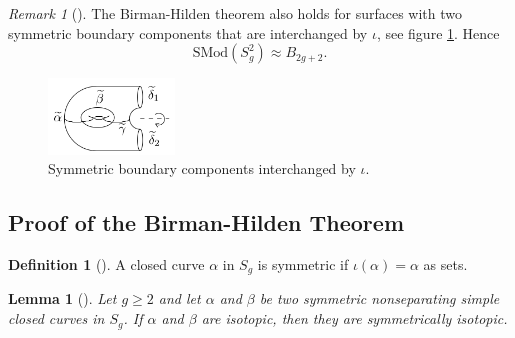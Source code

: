 \documentclass[reqno]{amsart}
\newtheorem{lemma}[theorem]{Lemma}
\theoremstyle{definition}
\newtheorem{definition}[theorem]{Definition}
\theoremstyle{remark}
\newtheorem*{remark}{Remark}
\newcommand{\SMod}{{\mathrm{SMod}}}
\begin{document}
   \begin{remark}[]
       The Birman-Hilden theorem also holds for
       surfaces with two symmetric boundary
       components that are interchanged by
       $\iota$, see figure
       \ref{fig:-Birman-Hilden-two-symmetric-boundary-components-png}.
       Hence
       \[
       \SMod \left( S_g^{2} \right) 
       \approx B_{2g+2}.
       \] 

        \begin{figure}[htpb]
           \centering
           \includegraphics[width=0.3\textwidth]{
           Birman-Hilden-two-symmetric-boundary-components.png}
           \caption{Symmetric boundary components
           interchanged by $\iota$.}
           \label{fig:-Birman-Hilden-two-symmetric-boundary-components-png}
       \end{figure}
   \end{remark}





   \subsection{Proof of the Birman-Hilden Theorem}

   \begin{definition}[]
       A closed curve $\alpha$ in $S_g$ is symmetric
       if $\iota \left( \alpha \right) = \alpha$ as sets.
   \end{definition}

   \begin{lemma}[]\label{loops-isotopic-iff-symmetrically-isotopic}
       Let $g \ge 2$ and let $\alpha$ and $\beta$ be
       two symmetric nonseparating simple closed
       curves in $S_g$. If $\alpha$ and $\beta$ are isotopic,
       then they are symmetrically isotopic.
   \end{lemma}
\end{document}
